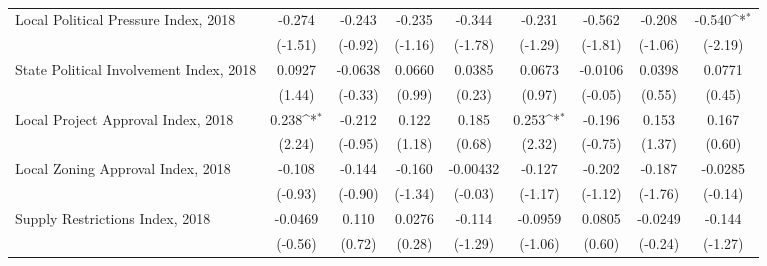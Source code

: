 \begin{table}[htbp]\centering
\def\sym#1{\ifmmode^{#1}\else\(^{#1}\)\fi}
\caption{ \label{tab1}}
\begin{tabular}{l*{8}{c}}
\toprule
\midrule
Local Political Pressure Index, 2018&      -0.274         &      -0.243         &      -0.235         &      -0.344         &      -0.231         &      -0.562         &      -0.208         &      -0.540\sym{*}  \\
                    &     (-1.51)         &     (-0.92)         &     (-1.16)         &     (-1.78)         &     (-1.29)         &     (-1.81)         &     (-1.06)         &     (-2.19)         \\
\addlinespace
State Political Involvement Index, 2018&      0.0927         &     -0.0638         &      0.0660         &      0.0385         &      0.0673         &     -0.0106         &      0.0398         &      0.0771         \\
                    &      (1.44)         &     (-0.33)         &      (0.99)         &      (0.23)         &      (0.97)         &     (-0.05)         &      (0.55)         &      (0.45)         \\
\addlinespace
Local Project Approval Index, 2018&       0.238\sym{*}  &      -0.212         &       0.122         &       0.185         &       0.253\sym{*}  &      -0.196         &       0.153         &       0.167         \\
                    &      (2.24)         &     (-0.95)         &      (1.18)         &      (0.68)         &      (2.32)         &     (-0.75)         &      (1.37)         &      (0.60)         \\
\addlinespace
Local Zoning Approval Index, 2018&      -0.108         &      -0.144         &      -0.160         &    -0.00432         &      -0.127         &      -0.202         &      -0.187         &     -0.0285         \\
                    &     (-0.93)         &     (-0.90)         &     (-1.34)         &     (-0.03)         &     (-1.17)         &     (-1.12)         &     (-1.76)         &     (-0.14)         \\
\addlinespace
Supply Restrictions Index, 2018&     -0.0469         &       0.110         &      0.0276         &      -0.114         &     -0.0959         &      0.0805         &     -0.0249         &      -0.144         \\
                    &     (-0.56)         &      (0.72)         &      (0.28)         &     (-1.29)         &     (-1.06)         &      (0.60)         &     (-0.24)         &     (-1.27)         \\

\end{tabular}
\end{table}
